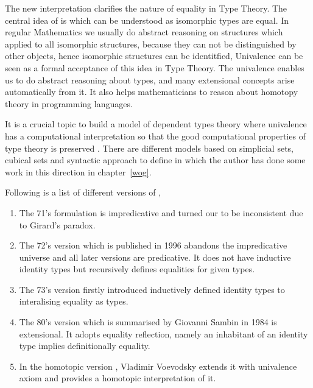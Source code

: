 The new interpretation clarifies the nature of equality in Type Theory.
The central idea of \hott is  which can be understood as isomorphic types are equal.
In regular Mathematics we usually do abstract reasoning on structures which applied to all isomorphic structures, because they can not be distinguished by other objects, hence isomorphic structures can be identitfied, Univalence can be seen as a formal acceptance of this idea in Type Theory. 
The univalence enables us to do abstract reasoning about types, and many extensional concepts arise automatically from it. It also helps mathematicians to reason about homotopy theory in programming languages.

It is a crucial topic to build a model of dependent types theory where univalence has a computational interpretation so that the good computational properties of type theory is preserved \cite{bezem2013model}. There are different models based on simplicial sets, cubical sets and syntactic approach to define \wog in \itt which the author has done some work in this direction in chapter~\ref{wog}.

Following is a list of different versions of \mltt,

\begin{enumerate}

\item The 71's formulation \cite{per:71} is impredicative and turned our to be inconsistent due to Girard's paradox.

\item The 72's version which is published in 1996 \cite{Martin-Lof-1972} abandons the impredicative universe and all later versions are predicative. It does not have inductive identity types but recursively defines equalities for given types.

\item The 73's version \cite{Martin-Lof-1973} firstly introduced inductively defined identity types to interalising equality as types. 

\item The 80's version which is summarised by Giovanni Sambin in 1984 \cite{martin1984intuitionistic} is extensional. It adopts equality reflection, namely an inhabitant of an identity type implies definitionally equality.

\item In the homotopic version \cite{hott}, Vladimir Voevodsky extends it with univalence axiom and provides a homotopic interpretation of it.

\end{enumerate}



